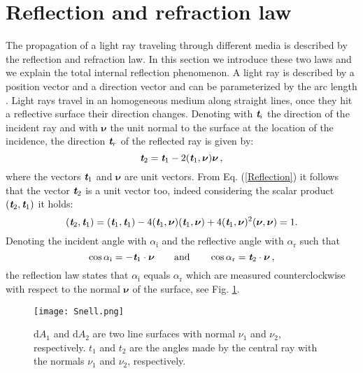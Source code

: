 \section{Reflection and refraction law}
The propagation of a light ray traveling through  different media is described by the reflection and refraction law.
In this section we introduce these two laws and we explain the total internal reflection phenomenon.
A light ray is described by a position vector  and a direction vector  and can be parameterized by the arc length .
Light rays travel in an homogeneous medium along straight lines, once they hit a reflective surface their direction changes.
 Denoting with $\textit{\textbf{t}}_i$ the direction of the incident ray and with $\boldsymbol{\nu}$ the unit normal to the surface at the location of the incidence, the direction $\textit{\textbf{t}}_r$ of the reflected ray is given by:
 \begin{equation}\label{Reflection}
  \textit{\textbf{t}}_2 = \textit{\textbf{t}}_1-2(\textit{\textbf{t}}_1,\boldsymbol{\nu})\boldsymbol{\nu}\,,
\end{equation}
where the vectors $\textit{\textbf{t}}_1$ and $\boldsymbol{\nu}$ are unit vectors. 
From Eq. (\ref{Reflection}) it follows that the vector  $\textit{\textbf{t}}_2$ is a unit vector too, indeed considering the scalar product $(\textit{\textbf{t}}_2,\textit{\textbf{t}}_1)$ it holds:
\begin{equation}\label{unit_vector}
(\textit{\textbf{t}}_2,\textit{\textbf{t}}_1) = (\textit{\textbf{t}}_1,\textit{\textbf{t}}_1) - 4(\textit{\textbf{t}}_1,\boldsymbol{\nu})(\textit{\textbf{t}}_1,\boldsymbol{\nu})+
4(\textit{\textbf{t}}_1,\boldsymbol{\nu})^2(\boldsymbol{\nu},\boldsymbol{\nu})=1 .
\end{equation} 
Denoting the incident angle with $\alpha_{\textrm{i}}$ and the reflective angle with $\alpha_\textrm{r}$ such that
\begin{equation}
\cos{\alpha_{\textrm{i}}} = -\textit{\textbf{t}}_1\cdot \boldsymbol{\nu} \qquad \mbox{and} \qquad \cos{\alpha_{\textrm{r}}} = \textit{\textbf{t}}_2 \cdot\boldsymbol{\nu}\,,
\end{equation}
the reflection law states that $\alpha_\textrm{i}$ equals $\alpha_\textrm{r}$ which are measured counterclockwise with respect to the normal $\boldsymbol{\nu}$ of the surface, see Fig. \ref{fig:Snell}.
\begin{figure}[h]
 \label{fig:Snell}
     \begin{center}
     \texttt{[image: Snell.png]}
     \end{center}
     \caption{\footnotesize{$\textrm{d}A_1$ and $\textrm{d}A_2$ are two line surfaces with normal $\nu_1$ and $\nu_2$, respectively. $t_1$ and $t_2$ are the angles made by the central ray with the normals $\nu_1$ and $\nu_2$, respectively.}}
\label{fig:Snell}
 \end{figure}
